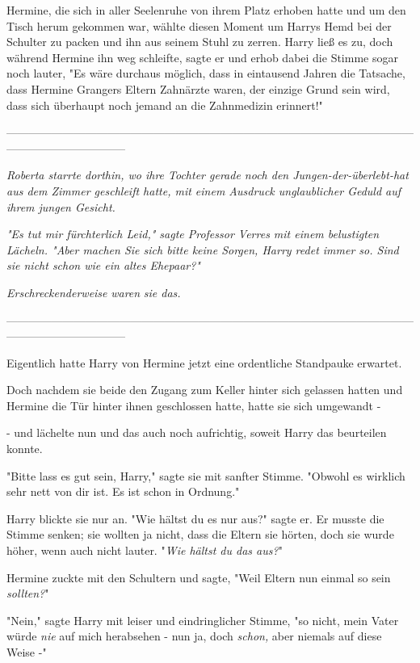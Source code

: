 {Hermine, die sich in aller Seelenruhe von ihrem Platz erhoben hatte und um den Tisch herum gekommen war, wählte diesen Moment um Harrys Hemd bei der Schulter zu packen und ihn aus seinem Stuhl zu zerren. Harry ließ es zu, doch während Hermine ihn weg schleifte, sagte er und erhob dabei die Stimme sogar noch lauter, "Es wäre durchaus möglich, dass in eintausend Jahren die Tatsache, dass Hermine Grangers Eltern Zahnärzte waren, der einzige Grund sein wird, dass sich überhaupt noch jemand an die Zahnmedizin erinnert!"

--------------------------------------------------------------------------------------------------------------------------------------------

\emph{Roberta starrte dorthin, wo ihre Tochter gerade noch den Jungen-der-überlebt-hat aus dem Zimmer geschleift hatte, mit einem Ausdruck unglaublicher Geduld auf ihrem jungen Gesicht.}

\emph{"Es tut mir fürchterlich Leid," sagte Professor Verres mit einem belustigten Lächeln. "Aber machen Sie sich bitte keine Sorgen, Harry redet immer so. Sind sie nicht schon wie ein altes Ehepaar?"}

\emph{Erschreckenderweise} \emph{\emph{waren}} \emph{sie das.}

--------------------------------------------------------------------------------------------------------------------------------------------

Eigentlich hatte Harry von Hermine jetzt eine ordentliche Standpauke erwartet.

Doch nachdem sie beide den Zugang zum Keller hinter sich gelassen hatten und Hermine die Tür hinter ihnen geschlossen hatte, hatte sie sich umgewandt -

- und lächelte nun und das auch noch aufrichtig, soweit Harry das beurteilen konnte.

"Bitte lass es gut sein, Harry," sagte sie mit sanfter Stimme. "Obwohl es wirklich sehr nett von dir ist. Es ist schon in Ordnung."

Harry blickte sie nur an. "Wie hältst du es nur aus?" sagte er. Er musste die Stimme senken; sie wollten ja nicht, dass die Eltern sie hörten, doch sie wurde höher, wenn auch nicht lauter. "\emph{Wie hältst du das aus?}"

Hermine zuckte mit den Schultern und sagte, "Weil Eltern nun einmal so sein \emph{sollten?}"

"Nein," sagte Harry mit leiser und eindringlicher Stimme, "so nicht, mein Vater würde \emph{nie} auf mich herabsehen - nun ja, doch \emph{schon,} aber niemals auf diese Weise -"

}
